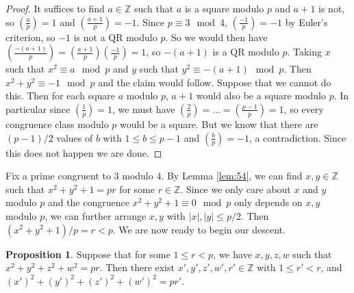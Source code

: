 \documentclass{article}
\newcommand{\Z}{\mathbb{Z}}
\newcommand{\rb}[1]{\left( #1 \right)}
\newcommand{\abs}[1]{\left\lvert #1 \right\rvert}
\newcommand{\legendre}[2]{\rb{\tfrac{#1}{#2}}}
\theoremstyle{definition}\newtheorem{definition}{Definition}
\theoremstyle{definition}\newtheorem{remark}[definition]{Remark}
\theoremstyle{definition}\newtheorem*{example}{Example}
\theoremstyle{definition}\newtheorem*{note}{Note}
\newtheorem{proposition}[definition]{Proposition}
\begin{document}
\begin{proof}
It suffices to find $ a \in \Z $ such that $ a $ is a square modulo $ p $ and $ a + 1 $ is not, so $ \legendre{a}{p} = 1 $ and $ \legendre{a + 1}{p} = -1 $. Since $ p \equiv 3 \mod 4 $, $ \legendre{-1}{p} = -1 $ by Euler's criterion, so $ -1 $ is not a QR modulo $ p $. So we would then have $ \legendre{-\rb{a + 1}}{p} = \legendre{a + 1}{p}\legendre{-1}{p} = 1 $, so $ -\rb{a + 1} $ is a QR modulo $ p $. Taking $ x $ such that $ x^2 \equiv a \mod p $ and $ y $ such that $ y^2 \equiv -\rb{a + 1} \mod p $. Then $ x^2 + y^2 \equiv -1 \mod p $ and the claim would follow. Suppose that we cannot do this. Then for each square $ a $ modulo $ p $, $ a + 1 $ would also be a square modulo $ p $. In particular since $ \legendre{1}{p} = 1 $, we must have $ \legendre{2}{p} = \dots = \legendre{p - 1}{p} = 1 $, so every congruence class modulo $ p $ would be a square. But we know that there are $ \rb{p - 1} / 2 $ values of $ b $ with $ 1 \le b \le p - 1 $ and $ \legendre{b}{p} = -1 $, a contradiction. Since this does not happen we are done.
\end{proof}

Fix a prime congruent to $ 3 $ modulo $ 4 $. By Lemma \ref{lem:54}, we can find $ x, y \in \Z $ such that $ x^2 + y^2 + 1 = pr $ for some $ r \in \Z $. Since we only care about $ x $ and $ y $ modulo $ p $ and the congruence $ x^2 + y^2 + 1 \equiv 0 \mod p $ only depends on $ x, y $ modulo $ p $, we can further arrange $ x, y $ with $ \abs{x}, \abs{y} \le p / 2 $. Then $ \rb{x^2 + y^2 + 1} / p = r < p $. We are now ready to begin our descent.

\begin{proposition}
\label{prop:55}
Suppose that for some $ 1 \le r < p $, we have $ x, y, z, w $ such that $ x^2 + y^2 + z^2 + w^2 = pr $. Then there exist $ x', y', z', w', r' \in \Z $ with $ 1 \le r' < r $, and $ \rb{x'}^2 + \rb{y'}^2 + \rb{z'}^2 + \rb{w'}^2 = pr' $.
\end{proposition}
\end{document}
